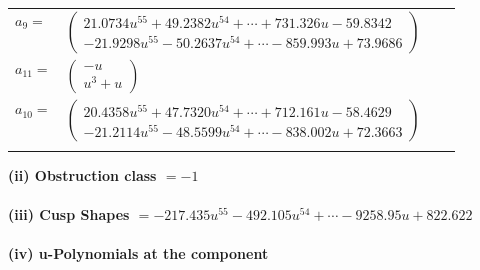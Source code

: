 \documentclass[1p]{elsarticle_modified}
\theoremstyle{definition}
\begin{document}
\begin{tabular}{m{7pt} m{180pt} m{7pt} m{180pt} }
\flushright $a_{9}=$&$\begin{pmatrix}21.0734 u^{55}+49.2382 u^{54}+\cdots+731.326 u-59.8342\\-21.9298 u^{55}-50.2637 u^{54}+\cdots-859.993 u+73.9686\end{pmatrix}$ \\
\flushright $a_{11}=$&$\begin{pmatrix}- u\\u^3+u\end{pmatrix}$ \\
\flushright $a_{10}=$&$\begin{pmatrix}20.4358 u^{55}+47.7320 u^{54}+\cdots+712.161 u-58.4629\\-21.2114 u^{55}-48.5599 u^{54}+\cdots-838.002 u+72.3663\end{pmatrix}$\\&\end{tabular}
\flushleft \textbf{(ii) Obstruction class $= -1$}\\~\\
\flushleft \textbf{(iii) Cusp Shapes $= -217.435 u^{55}-492.105 u^{54}+\cdots-9258.95 u+822.622$}\\~\\
\newpage\renewcommand{\arraystretch}{1}
\flushleft \textbf{(iv) u-Polynomials at the component}\newline \\
\end{document}
